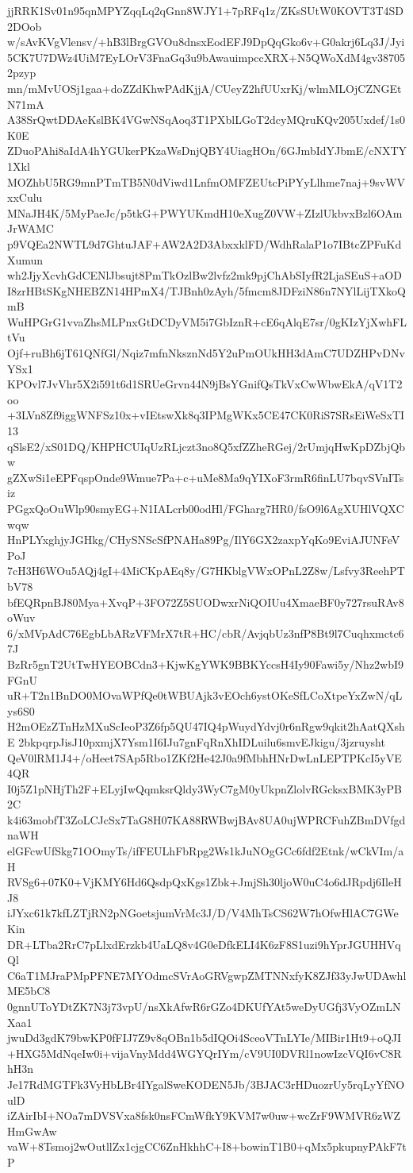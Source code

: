 jjRRK1Sv01n95qnMPYZqqLq2qGnn8WJY1+7pRFq1z/ZKsSUtW0KOVT3T4SD2DOob
w/sAvKVgVlensv/+hB3lBrgGVOu8dnsxEodEFJ9DpQqGko6v+G0akrj6Lq3J/Jyi
5CK7U7DWz4UiM7EyLOrV3FnaGq3u9bAwauimpccXRX+N5QWoXdM4gv387052pzyp
mn/mMvUOSj1gaa+doZZdKhwPAdKjjA/CUeyZ2hfUUxrKj/wlmMLOjCZNGEtN71mA
A38SrQwtDDAeKslBK4VGwNSqAoq3T1PXblLGoT2dcyMQruKQv205Uxdef/1s0K0E
ZDuoPAhi8aIdA4hYGUkerPKzaWsDnjQBY4UiagHOn/6GJmbIdYJbmE/cNXTY1Xkl
MOZhbU5RG9mnPTmTB5N0dViwd1LnfmOMFZEUtcPiPYyLlhme7naj+9svWVxxCulu
MNaJH4K/5MyPaeJc/p5tkG+PWYUKmdH10eXugZ0VW+ZIzlUkbvxBzl6OAmJrWAMC
p9VQEa2NWTL9d7GhtuJAF+AW2A2D3AbxxklFD/WdhRalaP1o7IBtcZPFuKdXumun
wh2JjyXcvhGdCENlJbsujt8PmTkOzlBw2lvfz2mk9pjChAbSIyfR2LjaSEuS+aOD
I8zrHBtSKgNHEBZN14HPmX4/TJBnh0zAyh/5fmcm8JDFziN86n7NYlLijTXkoQmB
WuHPGrG1vvaZhsMLPnxGtDCDyVM5i7GbIznR+cE6qAlqE7sr/0gKIzYjXwhFLtVu
Ojf+ruBh6jT61QNfGl/Nqiz7mfnNksznNd5Y2uPmOUkHH3dAmC7UDZHPvDNvYSx1
KPOvl7JvVhr5X2i591t6d1SRUeGrvn44N9jBsYGnifQsTkVxCwWbwEkA/qV1T2oo
+3LVn8Zf9iggWNFSz10x+vIEtswXk8q3IPMgWKx5CE47CK0RiS7SRsEiWeSxTI13
qSlsE2/xS01DQ/KHPHCUIqUzRLjczt3no8Q5xfZZheRGej/2rUmjqHwKpDZbjQbw
gZXwSi1eEPFqspOnde9Wmue7Pa+c+uMe8Ma9qYIXoF3rmR6finLU7bqvSVnITsiz
PGgxQoOuWlp90smyEG+N1IALcrb00odHl/FGharg7HR0/fsO9l6AgXUHlVQXCwqw
HnPLYxghjyJGHkg/CHySNScSfPNAHa89Pg/IlY6GX2zaxpYqKo9EviAJUNFeVPoJ
7cH3H6WOu5AQj4gI+4MiCKpAEq8y/G7HKblgVWxOPnL2Z8w/Lsfvy3ReehPTbV78
bfEQRpnBJ80Mya+XvqP+3FO72Z5SUODwxrNiQOIUu4XmaeBF0y727rsuRAv8oWuv
6/xMVpAdC76EgbLbARzVFMrX7tR+HC/cbR/AvjqbUz3nfP8Bt9l7Cuqhxmctc67J
BzRr5gnT2UtTwHYEOBCdn3+KjwKgYWK9BBKYccsH4Iy90Fawi5y/Nhz2wbI9FGnU
uR+T2n1BnDO0MOvaWPfQe0tWBUAjk3vEOch6ystOKeSfLCoXtpeYxZwN/qLys6S0
H2mOEzZTnHzMXuScIeoP3Z6fp5QU47IQ4pWuydYdvj0r6nRgw9qkit2hAatQXshE
2bkpqrpJisJ10pxmjX7Ysm1I6IJu7gnFqRnXhIDLuilu6smvEJkigu/3jzruysht
QeV0lRM1J4+/oHeet7SAp5Rbo1ZKf2He42J0a9fMbhHNrDwLnLEPTPKcI5yVE4QR
I0j5Z1pNHjTh2F+ELyjIwQqmksrQldy3WyC7gM0yUkpnZlolvRGcksxBMK3yPB2C
k4i63mobfT3ZoLCJcSx7TaG8H07KA88RWBwjBAv8UA0ujWPRCFuhZBmDVfgdnaWH
elGFcwUfSkg71OOmyTs/ifFEULhFbRpg2Ws1kJuNOgGCc6fdf2Etnk/wCkVIm/aH
RVSg6+07K0+VjKMY6Hd6QsdpQxKgs1Zbk+JmjSh30ljoW0uC4o6dJRpdj6IleHJ8
iJYxc61k7kfLZTjRN2pNGoetsjumVrMc3J/D/V4MhTsCS62W7hOfwHlAC7GWeKin
DR+LTba2RrC7pLlxdErzkb4UaLQ8v4G0eDfkELI4K6zF8S1uzi9hYprJGUHHVqQl
C6aT1MJraPMpPFNE7MYOdmcSVrAoGRVgwpZMTNNxfyK8ZJf33yJwUDAwhlME5bC8
0gnnUToYDtZK7N3j73vpU/nsXkAfwR6rGZo4DKUfYAt5weDyUGfj3VyOZmLNXaa1
jwuDd3gdK79bwKP0fFIJ7Z9v8qOBn1b5dIQOi4SceoVTnLYIe/MIBir1Ht9+oQJI
+HXG5MdNqeIw0i+vijaVnyMdd4WGYQrIYm/cV9UI0DVRl1nowIzcVQI6vC8RhH3n
Je17RdMGTFk3VyHbLBr4IYgalSweKODEN5Jb/3BJAC3rHDuozrUy5rqLyYfNOulD
iZAirIbI+NOa7mDVSVxa8fsk0nsFCmWfkY9KVM7w0uw+wcZrF9WMVR6zWZHmGwAw
vaW+8Tsmoj2wOutllZx1cjgCC6ZnHkhhC+I8+bowinT1B0+qMx5pkupnyPAkF7tP
